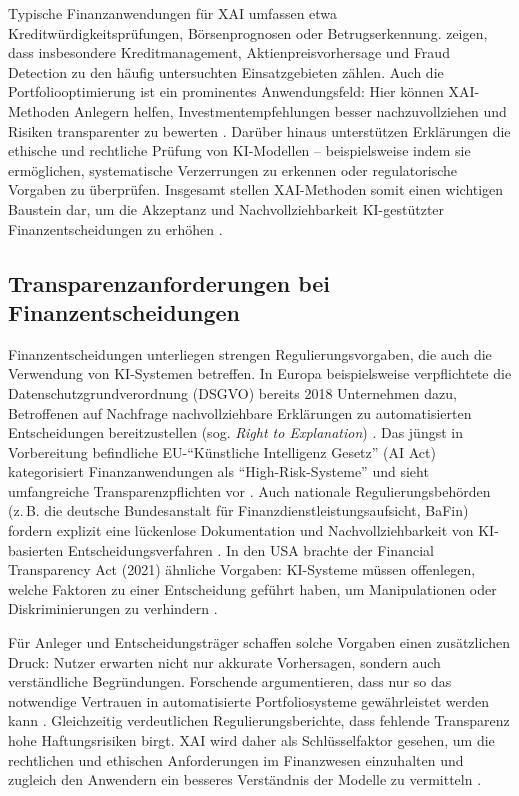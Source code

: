   Typische Finanzanwendungen für \acs{XAI} umfassen etwa Kreditwürdigkeitsprüfungen, Börsenprognosen oder Betrugserkennung.
  \textcite{Cerneviciene2024} zeigen, dass insbesondere Kreditmanagement, Aktienpreisvorhersage und Fraud Detection zu den häufig untersuchten Einsatzgebieten zählen.
  Auch die Portfoliooptimierung ist ein prominentes Anwendungsfeld: Hier können \acs{XAI}-Methoden Anlegern helfen, Investmentempfehlungen besser nachzuvollziehen und Risiken transparenter zu bewerten \autocite{Cerneviciene2024}.
  Darüber hinaus unterstützen Erklärungen die ethische und rechtliche Prüfung von KI-Modellen – beispielsweise indem sie ermöglichen, systematische Verzerrungen zu erkennen oder regulatorische Vorgaben zu überprüfen.
  Insgesamt stellen \acs{XAI}-Methoden somit einen wichtigen Baustein dar, um die Akzeptanz und Nachvollziehbarkeit \acs{KI}-gestützter Finanzentscheidungen zu erhöhen \autocite{Weber2024, Cerneviciene2024}.

  \subsection{Transparenzanforderungen bei Finanzentscheidungen}

    Finanzentscheidungen unterliegen strengen Regulierungsvorgaben, die auch die Verwendung von \acs{KI}-Systemen betreffen.
    In Europa beispielsweise verpflichtete die Datenschutzgrundverordnung (\acs{DSGVO}) bereits 2018 Unternehmen dazu, Betroffenen auf Nachfrage nachvollziehbare Erklärungen zu automatisierten Entscheidungen bereitzustellen (sog. \emph{Right to Explanation}) \autocite[S. 869]{Weber2024}.
    Das jüngst in Vorbereitung befindliche \acs{EU}-\enquote{Künstliche Intelligenz Gesetz} (AI Act) kategorisiert Finanzanwendungen als \enquote{High-Risk-Systeme} und sieht umfangreiche Transparenzpflichten vor \autocite[S. 868-870]{Weber2024}.
    Auch nationale Regulierungsbehörden (z.\,B. die deutsche Bundesanstalt für Finanzdienstleistungsaufsicht, BaFin) fordern explizit eine lückenlose Dokumentation und Nachvollziehbarkeit von KI-basierten Entscheidungsverfahren \autocite[S. 869]{Weber2024}.
    In den USA brachte der Financial Transparency Act (2021) ähnliche Vorgaben:
    \acs{KI}-Systeme müssen offenlegen, welche Faktoren zu einer Entscheidung geführt haben, um Manipulationen oder Diskriminierungen zu verhindern \autocite[S. 869]{Weber2024}.

    Für Anleger und Entscheidungsträger schaffen solche Vorgaben einen zusätzlichen Druck:
    Nutzer erwarten nicht nur akkurate Vorhersagen, sondern auch verständliche Begründungen.
    Forschende argumentieren, dass nur so das notwendige Vertrauen in automatisierte Portfoliosysteme gewährleistet werden kann \autocite[S. 872]{Weber2024}.
    Gleichzeitig verdeutlichen Regulierungsberichte, dass fehlende Transparenz hohe Haftungsrisiken birgt.
    \acs{XAI} wird daher als Schlüsselfaktor gesehen, um die rechtlichen und ethischen Anforderungen im Finanzwesen einzuhalten und zugleich den Anwendern ein besseres Verständnis der Modelle zu vermitteln \autocite[S. 872-875]{Weber2024}.

